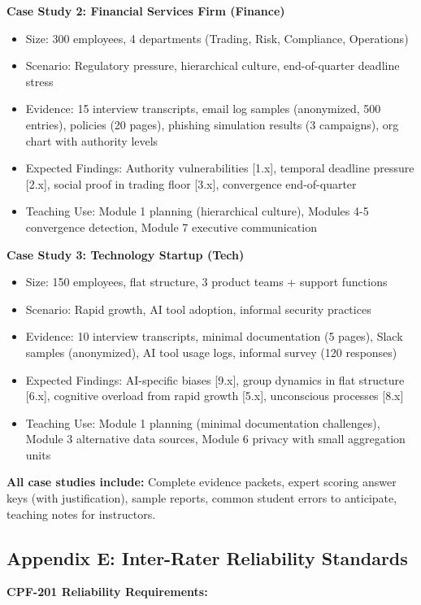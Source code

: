 \documentclass[11pt,a4paper]{article}
\begin{document}
\textbf{Case Study 2: Financial Services Firm (Finance)}
\begin{itemize}
\item Size: 300 employees, 4 departments (Trading, Risk, Compliance, Operations)
\item Scenario: Regulatory pressure, hierarchical culture, end-of-quarter deadline stress
\item Evidence: 15 interview transcripts, email log samples (anonymized, 500 entries), policies (20 pages), phishing simulation results (3 campaigns), org chart with authority levels
\item Expected Findings: Authority vulnerabilities [1.x], temporal deadline pressure [2.x], social proof in trading floor [3.x], convergence end-of-quarter
\item Teaching Use: Module 1 planning (hierarchical culture), Modules 4-5 convergence detection, Module 7 executive communication
\end{itemize}

\textbf{Case Study 3: Technology Startup (Tech)}
\begin{itemize}
\item Size: 150 employees, flat structure, 3 product teams + support functions
\item Scenario: Rapid growth, AI tool adoption, informal security practices
\item Evidence: 10 interview transcripts, minimal documentation (5 pages), Slack samples (anonymized), AI tool usage logs, informal survey (120 responses)
\item Expected Findings: AI-specific biases [9.x], group dynamics in flat structure [6.x], cognitive overload from rapid growth [5.x], unconscious processes [8.x]
\item Teaching Use: Module 1 planning (minimal documentation challenges), Module 3 alternative data sources, Module 6 privacy with small aggregation units
\end{itemize}

\textbf{All case studies include:} Complete evidence packets, expert scoring answer keys (with justification), sample reports, common student errors to anticipate, teaching notes for instructors.

\subsection{Appendix E: Inter-Rater Reliability Standards}

\textbf{CPF-201 Reliability Requirements:}
\end{document}
